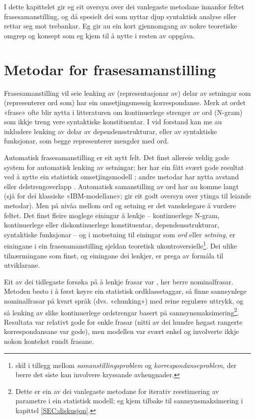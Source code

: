 \documentclass[12pt,a4paper,oneside,draft]{report}
\begin{document}
I dette kapittelet gir eg eit oversyn over dei vanlegaste metodane
 innanfor feltet frasesamanstilling, og då spesielt dei som nyttar
 djup syntaktisk analyse eller rettar seg mot trebankar. Eg gir au ein
 kort gjennomgang av nokre teoretiske omgrep og konsept som eg kjem
 til å nytte i resten av oppgåva.

\section{Metodar for frasesamanstilling}
\label{sec-2.1}

Frasesamanstilling vil seie lenking av (representasjonar av) delar av
 setningar som (representerer ord som) har ein omsetjingsmessig
 korrespondanse. Merk at ordet «frase» ofte blir nytta i litteraturen
 om kontinuerlege strenger av ord (N-gram) som ikkje treng vere
 syntaktiske konstituentar. I vid forstand kan me au inkludere
 lenking av delar av dependensstrukturar, eller av syntaktiske
 funksjonar, som begge representerer mengder med ord.

Automatisk frasesamanstilling er eit nytt felt.  Det finst allereie
 veldig gode system for automatisk lenking av setningar; her har ein
 fått svært gode resultat ved å nytte ein statistisk omsetjingsmodell
 \citep{chen1993asb}; andre metodar har nytta avstand eller
 delstrengoverlapp
 \citep[s.~467--484~gir~eit~oversyn]{manning99foundations}.
 Automatisk samanstilling av ord har au komme langt (sjå
 \citet{brown1993msm} for dei klassiske «IBM-modellane»;
 \citet{och2003scv} gir eit godt oversyn over ytinga til leiande
 metodar).  Men på nivåa mellom ord og setning er det vanskelegare å
 vurdere feltet.  Det finst fleire moglege einingar å lenkje --
 kontinuerlege N-gram, kontinuerlege eller diskontinuerlege
 konstituentar, dependensstrukturar, syntaktiske funksjonar -- og i
 motsetning til einingar som \emph{ord} eller \emph{setning}, er einingane i ein
 frasesamanstilling sjeldan teoretisk ukontroversielle\footnote{\citet[s.~470]{manning99foundations} skil i tillegg mellom
        \emph{samanstillingsproblem} og \emph{korrespondanseproblem}, der berre
        det siste kan involvere kryssande avhengnader. }.  Dei
 ulike tilnærmingane som finst, og einingane dei lenkjer, er prega av
 formåla til utviklarane.

Eit av dei tidlegaste forsøka på å lenkje frasar var
 \citet{kupiec1993afn}, her berre nominalfrasar. Metoden besto i å
 først køyre ein statistisk ordklassetaggar, så finne sannsynlege
 nominalfrasar på kvart språk (dvs. «chunking») med reine regulære
 uttrykk, og så lenking av slike kontinuerlege ordstrengar basert på
 sannsynsmaksimering\footnote{Dette er ein av dei vanlegaste metodane for iterativ
        reestimering av parametre i ein statistisk modell; eg kjem
        tilbake til sannsynsmaksimering i kapittel
        \ref{SEC:diskusjon}. }. Resultata var relativt gode for enkle
 frasar (nitti av dei hundre høgast rangerte korrespondansane var
 gode), men modellen var svært enkel og involverte ikkje nokon
 kontekst rundt frasane.
\end{document}
